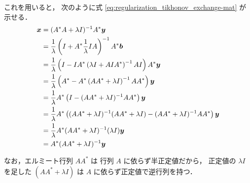 これを用いると，
次のように式 \eqref{eq:regularization_tikhonov_exchange-mat} が示せる．
\begin{align}
    \bm{x} & = (A^* A + \lambda I)^{-1} A^* \bm{y}
    \notag                                                                                                   \\
           & =\frac{1}{\lambda} \left(I + A^* \frac{1}{\lambda} I A \right)^{-1}A^* \bm{b}
    \notag                                                                                                   \\
           & =\frac{1}{\lambda} \left(I - I A^* \left(\lambda I + A I A^* \right)^{-1} A I \right) A^*\bm{y}
    \notag                                                                                                   \\
           & =\frac{1}{\lambda} \left(A^* - A^* \left(A A^* + \lambda I \right)^{-1} A A^* \right) \bm{y}
    \notag                                                                                                   \\
           & =\frac{1}{\lambda} A^* \left(I - (A A^* + \lambda I )^{-1} A A^* \right) \bm{y}
    \notag                                                                                                   \\
           & =\frac{1}{\lambda} A^* \left((A A^* + \lambda I )^{-1} (A A^* + \lambda I )
    - (AA^* + \lambda I )^{-1}AA^* \right) \bm{y}
    \notag                                                                                                   \\
           & =\frac{1}{\lambda} A^* (A A^* + \lambda I )^{-1} (\lambda I) \bm{y}
    \notag                                                                                                   \\
           & =A^* (A A^* + \lambda I)^{-1} \bm{y}
\end{align}

なお，エルミート行列 $A A^*$ は
行列 $A$ に依らず半正定値だから，
正定値の $\lambda I$ を足した
$(A A^* + \lambda I)$ は $A$ に依らず正定値で逆行列を持つ．
